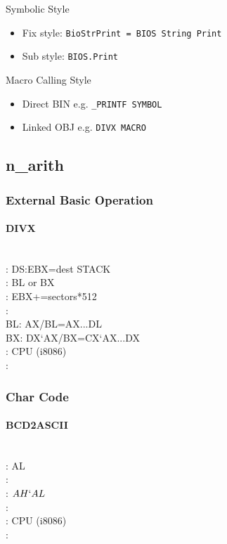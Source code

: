 
Symbolic Style
\begin{itemize}
	\item Fix style: \verb`BioStrPrint = BIOS String Print`
	\item Sub style: \verb`BIOS.Print`
\end{itemize}

Macro Calling Style
\begin{itemize}
	\item Direct BIN e.g. \verb`_PRINTF SYMBOL`
	\item Linked OBJ e.g. \verb`DIVX MACRO`
\end{itemize}


\subsection{n\_arith}

\subsubsection{External Basic Operation}

\paragraph{DIVX} \
\\
: DS:EBX=dest STACK \\
: BL or BX \\
: EBX+=sectors*512 \\
: \\
BL: AX/BL=AX...DL \\
BX: DX`AX/BX=CX`AX...DX \\
: CPU (i8086) \\
: 

\subsubsection{Char Code}
\paragraph{BCD2ASCII} \
\\
: AL \\
:  \\
: $AH`AL$ \\
: \\
: CPU (i8086) \\
: 

